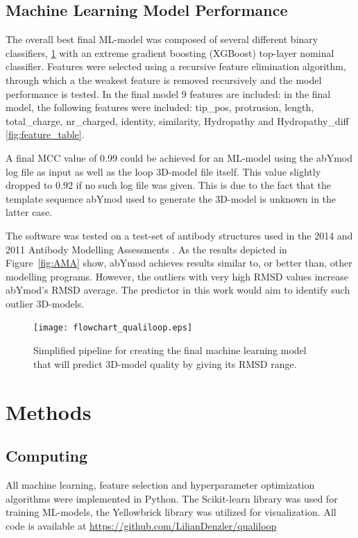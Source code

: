 \subsection{Machine Learning Model Performance}
The overall best final ML-model was composed of several different binary
classifiers, \ref{fig:flow} with an extreme gradient boosting (XGBoost) top-layer
nominal classifier. Features were selected using a recursive feature elimination algorithm, through which a the weakest feature is removed recursively and the model performance is tested. In the final model 9 features are included: in the final model, the following features were included: tip\_pos, protrusion, length, total\_charge, nr\_charged, identity, similarity, Hydropathy and Hydropathy\_diff \ref{fig:feature_table}.

A final MCC value of 0.99 could be achieved for an ML-model
using the abYmod log file as input as well as the loop 3D-model file
itself. This value slightly dropped to 0.92 if no such log file was
given. This is due to the fact that the template sequence
abYmod used to generate the 3D-model is unknown in the latter case.



The software
was tested on a test-set of antibody structures used in the 2014 and
2011 Antibody Modelling Assessments
\cite{Almagro2011,Almagro2014}. As the results depicted in
Figure~\ref{fig:AMA} show, abYmod achieves results similar to, or better than,
other modelling programs. However, the outliers with very high RMSD
values increase abYmod's RMSD average. The predictor in this work
would aim to identify such outlier 3D-models.


\begin{figure}
  \centering
  \texttt{[image: flowchart\_qualiloop.eps]}
  \caption {Simplified pipeline for creating the final machine learning model that will predict 3D-model quality by giving its RMSD range.}
  \label{fig:flow}
\end{figure}
 
\section{Methods}

\subsection{Computing}
All machine learning, feature selection and hyperparameter
optimization algorithms were implemented in Python. The Scikit-learn
library was used for training ML-models, the
Yellowbrick\cite{Bengfort2021} library was utilized for
visualization. All code is available at
\url{https://github.com/LilianDenzler/qualiloop}


